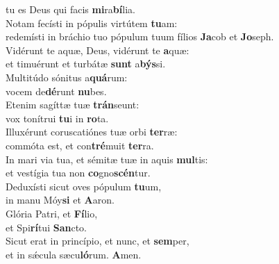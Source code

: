 \oddverse tu es Deus qui facis \textbf{mi}ra\textbf{bí}lia.\\
\evenverse Notam fecísti in pópulis virtútem \textbf{tu}am:~\*\\
\evenverse redemísti in bráchio tuo pópulum tuum fílios \textbf{Ja}cob et \textbf{Jo}seph.\\
\oddverse Vidérunt te aquæ, Deus, vidérunt te \textbf{a}quæ:~\*\\
\oddverse et timuérunt et turbátæ \textbf{sunt} a\textbf{býs}si.\\
\evenverse Multitúdo sónitus a\textbf{quá}rum:~\*\\
\evenverse vocem de\textbf{dé}runt \textbf{nu}bes.\\
\oddverse Etenim sagíttæ tuæ \textbf{trán}seunt:~\*\\
\oddverse vox tonítrui \textbf{tu}i in \textbf{ro}ta.\\
\evenverse Illuxérunt coruscatiónes tuæ orbi \textbf{ter}ræ:~\*\\
\evenverse commóta est, et con\textbf{tré}muit \textbf{ter}ra.\\
\oddverse In mari via tua, et sémitæ tuæ in aquis \textbf{mul}tis:~\*\\
\oddverse et vestígia tua non \textbf{co}gno\textbf{scén}tur.\\
\evenverse Deduxísti sicut oves pópulum \textbf{tu}um,~\*\\
\evenverse in manu Móy\textbf{si} et \textbf{A}aron.\\
\oddverse Glória Patri, et \textbf{Fí}lio,~\*\\
\oddverse et Spi\textbf{rí}tui \textbf{San}cto.\\
\evenverse Sicut erat in princípio, et nunc, et \textbf{sem}per,~\*\\
\evenverse et in sǽcula sæcu\textbf{ló}rum. \textbf{A}men.\\
